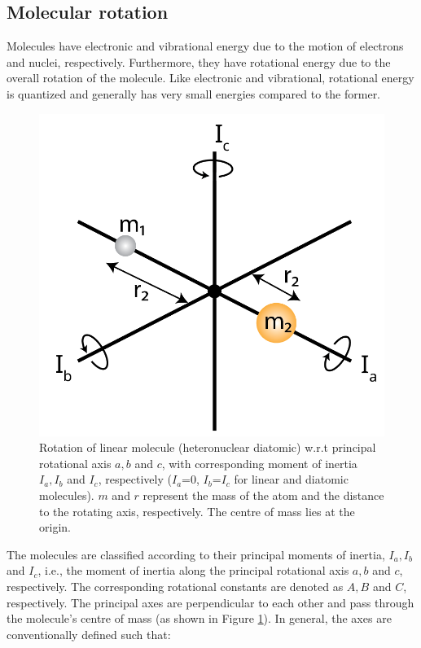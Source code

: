 \subsection{Molecular rotation}
\label{sec:mol-rotation}

Molecules have electronic and vibrational energy due to the motion of electrons and nuclei, respectively. Furthermore, they have rotational energy due to the overall rotation of the molecule. Like electronic and vibrational, rotational energy is quantized and generally has very small energies compared to the former.

\begin{figure}[!htb]
    \centering
    
    \includegraphics[scale=0.7]{figures/methods/rotation-rotor_linear.png}
    \caption{Rotation of linear molecule (heteronuclear diatomic) w.r.t principal rotational axis $a, b$ and $c$, with corresponding moment of inertia $I_a, I_b$ and $I_c$, respectively ($I_a$=0, $I_b$=$I_c$ for linear and diatomic molecules). $m$ and $r$ represent the mass of the atom and the distance to the rotating axis, respectively. The centre of mass lies at the origin.}
    \label{fig:rotor:diatomic}
\end{figure}

The molecules are classified according to their principal moments of inertia, $I_a, I_b$ and $I_c$, i.e., the moment of inertia along the principal rotational axis $a, b$ and $c$, respectively. The corresponding rotational constants are denoted as $A, B$ and $C$, respectively. The principal axes are perpendicular to each other and pass through the molecule's centre of mass (as shown in Figure \ref{fig:rotor:diatomic}). In general, the axes are conventionally defined such that: 

